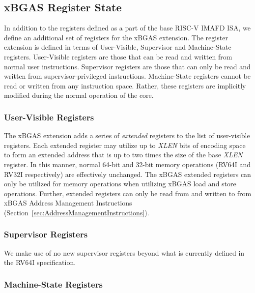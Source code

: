 \documentclass{article}
\begin{document}
\subsection{xBGAS Register State}
In addition to the registers defined as a part of the base RISC-V IMAFD ISA, we define an additional set of registers for the xBGAS extension.  The register extension is defined in terms of User-Visible, Supervisor and Machine-State registers.  User-Visible registers are those that can be read and written from normal user instructions.  Supervisor registers are those that can only be read and written from supervisor-privileged instructions.  Machine-State registers cannot be read or written from any instruction space.  Rather, these registers are implicitly modified during the normal operation of the core.     

\subsubsection{User-Visible Registers} 
The xBGAS extension adds a series of \emph{extended} registers to the list of user-visible registers.  Each extended register may utilize 
up to \textit{XLEN} bits of encoding space to form an extended address that is up to two times the size of the base \textit{XLEN} register.  
In this manner, normal 64-bit and 32-bit memory operations (RV64I and RV32I respectively) are effectively unchanged.  The xBGAS extended registers can only be utilized for memory operations when utilizing xBGAS load and store operations.  Further, extended registers can only be read from and written to from xBGAS Address Management Instructions (Section~\ref{sec:AddressManagementInstructions}).   

\begin{center}
\end{center}

\subsubsection{Supervisor Registers}

We make use of no new supervisor registers beyond what is 
currently defined in the RV64I specification.  

\subsubsection{Machine-State Registers}
\end{document}
